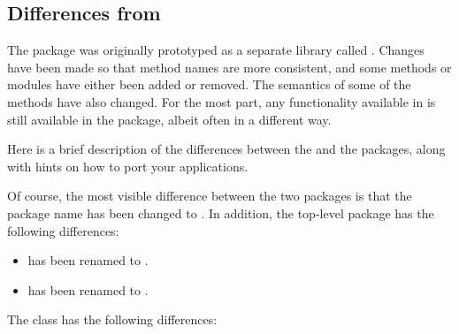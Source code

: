 \subsection{Differences from }

The  package was originally prototyped as a separate
library called .  Changes have been made so that
method names are more consistent, and some methods or modules have
either been added or removed.  The semantics of some of the methods
have also changed.  For the most part, any functionality available in
 is still available in the  package,
albeit often in a different way.

Here is a brief description of the differences between the
 and the  packages, along with hints on
how to port your applications.

Of course, the most visible difference between the two packages is
that the package name has been changed to .  In
addition, the top-level package has the following differences:

\begin{itemize}
\item {} has been renamed to
      .
\item {} has been renamed to
      .
\end{itemize}

The  class has the following differences:


